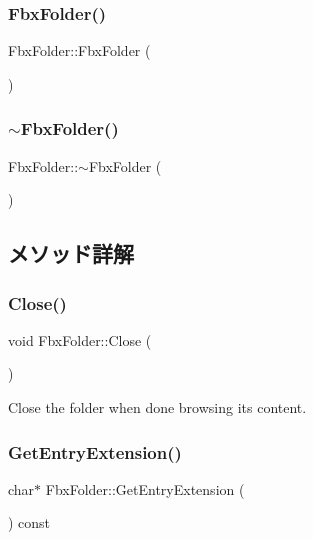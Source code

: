 \subsubsection{\texorpdfstring{Fbx\+Folder()}{FbxFolder()}}
{\footnotesize\ttfamily Fbx\+Folder\+::\+Fbx\+Folder (\begin{DoxyParamCaption}{ }\end{DoxyParamCaption})}

\mbox{\label{class_fbx_folder_a59775e144959137b55f9f7e2eefccfb4}} 
\subsubsection{\texorpdfstring{$\sim$\+Fbx\+Folder()}{~FbxFolder()}}
{\footnotesize\ttfamily Fbx\+Folder\+::$\sim$\+Fbx\+Folder (\begin{DoxyParamCaption}{ }\end{DoxyParamCaption})}



\subsection{メソッド詳解}
\mbox{\label{class_fbx_folder_a43be1ed2f95c3a0876b32b1e89a57c03}} 
\subsubsection{\texorpdfstring{Close()}{Close()}}
{\footnotesize\ttfamily void Fbx\+Folder\+::\+Close (\begin{DoxyParamCaption}{ }\end{DoxyParamCaption})}

Close the folder when done browsing its content. \mbox{\label{class_fbx_folder_a380385ead4cacb06613362f988f3634e}} 
\subsubsection{\texorpdfstring{Get\+Entry\+Extension()}{GetEntryExtension()}}
{\footnotesize\ttfamily char$\ast$ Fbx\+Folder\+::\+Get\+Entry\+Extension (\begin{DoxyParamCaption}{ }\end{DoxyParamCaption}) const}

